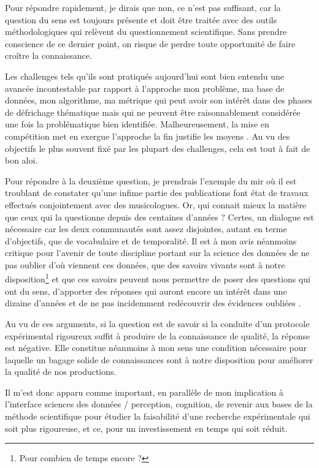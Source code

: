 Pour répondre rapidement, je dirais que non, ce n'est pas suffisant, car la question du sens est toujours présente et doit être traitée avec des outils méthodologiques qui relèvent du questionnement scientifique. Sans prendre conscience de ce dernier point, on risque de perdre toute opportunité de faire croître la connaissance.

Les challenges tels qu'ils sont pratiqués aujourd'hui sont bien entendu une avancée incontestable par rapport à l'approche \fg mon problème, ma base de données, mon algorithme, ma métrique \og qui peut avoir son intérêt dans des phases de défrichage thématique mais qui ne peuvent être raisonnablement considérée une fois la problématique bien identifiée. Malheureusement, la mise en compétition met en exergue l'approche \og la fin justifie les moyens \fg. Au vu des objectifs le plus souvent fixé par les plupart des challenges, cela est tout à fait de bon aloi.

Pour répondre à la deuxième question, je prendrais l'exemple du mir où il est troublant de constater qu'une infime partie des publications font état de travaux effectués conjointement avec des musicologues. Or, qui connait mieux la matière que ceux qui la questionne depuis des centaines d'années ? Certes, un dialogue est nécessaire car les deux communautés sont assez disjointes, autant en terme d'objectifs, que de vocabulaire et de temporalité. Il est à mon avis néanmoins critique pour l'avenir de toute discipline portant sur la science des données de ne pas oublier d'où viennent ces données, que des savoirs vivants sont à notre disposition\footnote{Pour combien de temps encore ?} et que ces savoirs peuvent nous permettre de poser des questions qui ont du sens, d'apporter des réponses qui auront encore un intérêt dans une dizaine d'années et de ne pas incidemment redécouvrir des évidences \og oubliées \fg.

Au vu de ces arguments, si la question est de savoir si la conduite d'un protocole expérimental rigoureux suffit à produire de la connaissance de qualité, la réponse est négative. Elle constitue néanmoins à mon sens une condition nécessaire pour laquelle un bagage solide de connaissances sont à notre disposition pour améliorer la qualité de nos productions.

Il m'est donc apparu comme important, en parallèle de mon implication à l'interface sciences des données / perception, cognition, de revenir aux bases de la méthode scientifique pour étudier la faisabilité d'une recherche expérimentale qui soit plus rigoureuse, et ce, pour un investissement en temps qui soit réduit.


